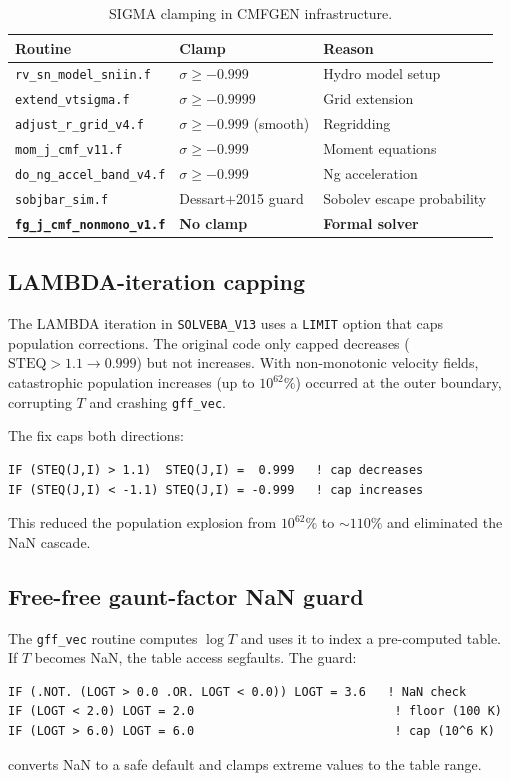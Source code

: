\documentclass[11pt,a4paper]{article}
\begin{document}
\begin{table}[ht]
\centering
\caption{SIGMA clamping in CMFGEN infrastructure.}
\label{tab:clamps}
\begin{tabular}{lll}
\toprule
Routine & Clamp & Reason \\
\midrule
\texttt{rv\_sn\_model\_sniin.f} & $\sigma \geq -0.999$ & Hydro model setup \\
\texttt{extend\_vtsigma.f} & $\sigma \geq -0.9999$ & Grid extension \\
\texttt{adjust\_r\_grid\_v4.f} & $\sigma \geq -0.999$ (smooth) & Regridding \\
\texttt{mom\_j\_cmf\_v11.f} & $\sigma \geq -0.999$ & Moment equations \\
\texttt{do\_ng\_accel\_band\_v4.f} & $\sigma \geq -0.999$ & Ng acceleration \\
\texttt{sobjbar\_sim.f} & Dessart+2015 guard & Sobolev escape probability \\
\textbf{\texttt{fg\_j\_cmf\_nonmono\_v1.f}} & \textbf{No clamp} & \textbf{Formal solver} \\
\bottomrule
\end{tabular}
\end{table}

\subsection{LAMBDA-iteration capping}

The LAMBDA iteration in \texttt{SOLVEBA\_V13} uses a \texttt{LIMIT} option
that caps population corrections.  The original code only capped
decreases ($\mathrm{STEQ} > 1.1 \to 0.999$) but not increases.  With
non-monotonic velocity fields, catastrophic population increases (up to
$10^{62}\%$) occurred at the outer boundary, corrupting $T$ and crashing
\texttt{gff\_vec}.

The fix caps both directions:
\begin{lstlisting}
IF (STEQ(J,I) > 1.1)  STEQ(J,I) =  0.999   ! cap decreases
IF (STEQ(J,I) < -1.1) STEQ(J,I) = -0.999   ! cap increases
\end{lstlisting}
This reduced the population explosion from $10^{62}\%$ to $\sim 110\%$
and eliminated the NaN cascade.

\subsection{Free-free gaunt-factor NaN guard}

The \texttt{gff\_vec} routine computes $\log T$ and uses it to index a
pre-computed table.  If $T$ becomes NaN, the table access segfaults.
The guard:
\begin{lstlisting}
IF (.NOT. (LOGT > 0.0 .OR. LOGT < 0.0)) LOGT = 3.6   ! NaN check
IF (LOGT < 2.0) LOGT = 2.0                            ! floor (100 K)
IF (LOGT > 6.0) LOGT = 6.0                            ! cap (10^6 K)
\end{lstlisting}
converts NaN to a safe default and clamps extreme values to the table
range.
\end{document}
